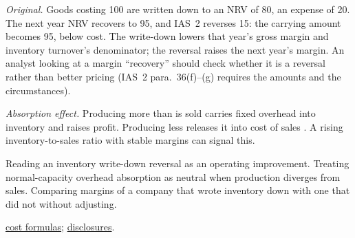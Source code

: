 \begin{qfmethod}
 \emph{Original.} Goods costing 100 are written down to an NRV of 80, an expense of 20. The next year NRV recovers to 95, and IAS~2 reverses 15: the carrying amount becomes 95, below cost. The write-down lowers that year's gross margin and inventory turnover's denominator; the reversal raises the next year's margin. An analyst looking at a margin ``recovery'' should check whether it is a reversal rather than better pricing (IAS~2 para.~36(f)--(g) requires the amounts and the circumstances).

\emph{Absorption effect.} Producing more than is sold carries fixed overhead into inventory and raises profit. Producing less releases it into cost of sales \citep[p.~236]{financial-statement-analysis-2009}. A rising inventory-to-sales ratio with stable margins can signal this.

 Reading an inventory write-down reversal as an operating improvement. Treating normal-capacity overhead absorption as neutral when production diverges from sales. Comparing margins of a company that wrote inventory down with one that did not without adjusting.

 \hyperref[meth:inventory-cost-formulas]{cost formulas}; \hyperref[meth:inventory-disclosure-analysis]{disclosures}.

\end{qfmethod}

